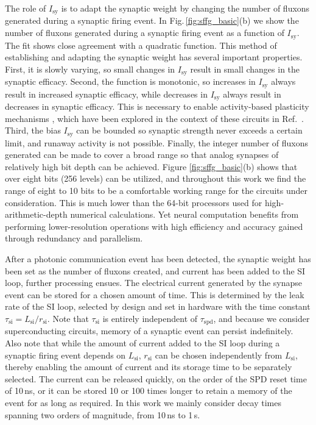 \documentclass[twocolumn]{article}
\newcommand{\onlinecite}[1]{\hspace{-1 ex} \nocite{#1}\citenum{#1}}
\begin{document}
The role of $I_{\mathrm{sy}}$ is to adapt the synaptic weight by changing the number of fluxons generated during a synaptic firing event. In Fig.\,\ref{fig:sffg_basic}(b) we show the number of fluxons generated during a synaptic firing event as a function of $I_{\mathrm{sy}}$. The fit shows close agreement with a quadratic function. This method of establishing and adapting the synaptic weight has several important properties. First, it is slowly varying, so small changes in $I_{\mathrm{sy}}$ result in small changes in the synaptic efficacy. Second, the function is monotonic, so increases in $I_{\mathrm{sy}}$ always result in increased synaptic efficacy, while decreases in $I_{\mathrm{sy}}$ always result in decreases in synaptic efficacy. This is necessary to enable activity-based plasticity mechanisms \cite{somi2000,mage2012}, which have been explored in the context of these circuits in Ref.\,\onlinecite{sh2018_full}. Third, the bias $I_{\mathrm{sy}}$ can be bounded so synaptic strength never exceeds a certain limit, and runaway activity is not possible. Finally, the integer number of fluxons generated can be made to cover a broad range so that analog synapses of relatively high bit depth can be achieved. Figure \ref{fig:sffg_basic}(b) shows that over eight bits (256 levels) can be utilized, and throughout this work we find the range of eight to 10 bits to be a comfortable working range for the circuits under consideration. This is much lower than the 64-bit processors used for high-arithmetic-depth numerical calculations. Yet neural computation benefits from performing lower-resolution operations with high efficiency and accuracy gained through redundancy and parallelism. 

After a photonic communication event has been detected, the synaptic weight has been set as the number of fluxons created, and current has been added to the SI loop, further processing ensues. The electrical current generated by the synapse event can be stored for a chosen amount of time. This is determined by the leak rate of the SI loop, selected by design and set in hardware with the time constant $\tau_{\mathrm{si}} = L_{\mathrm{si}}/r_{\mathrm{si}}$. Note that $\tau_{\mathrm{si}}$ is entirely independent of $\tau_{\mathrm{spd}}$, and because we consider superconducting circuits, memory of a synaptic event can persist indefinitely. Also note that while the amount of current added to the SI loop during a synaptic firing event depends on $L_{\mathrm{si}}$, $r_{\mathrm{si}}$ can be chosen independently from $L_{\mathrm{si}}$, thereby enabling the amount of current and its storage time to be separately selected. The current can be released quickly, on the order of the SPD reset time of 10\,ns, or it can be stored 10 or 100 times longer to retain a memory of the event for as long as required. In this work we mainly consider decay times spanning two orders of magnitude, from 10\,ns to 1\,\textmu s. 
\end{document}

